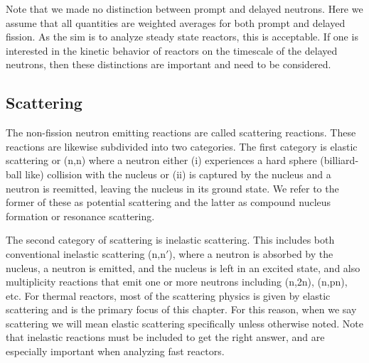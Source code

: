 Note that we made no distinction between prompt and delayed neutrons. Here we assume that all quantities are weighted averages for both prompt and delayed fission. As the sim is to analyze steady state reactors, this is acceptable. If one is interested in the kinetic behavior of reactors on the timescale of the delayed neutrons, then these distinctions are important and need to be considered. 

\subsection{Scattering}

The non-fission neutron emitting reactions are called scattering reactions. These reactions are likewise subdivided into two categories. The first category is elastic scattering or (n,n) where a neutron either (i) experiences a hard sphere (billiard-ball like) collision with the nucleus or (ii) is captured by the nucleus and a neutron is reemitted, leaving the nucleus in its ground state. We refer to the former of these as potential scattering and the latter as compound nucleus formation or resonance scattering. 

The second category of scattering is inelastic scattering. This includes both conventional inelastic scattering (n,$\text{n}'$), where a neutron is absorbed by the nucleus, a neutron is emitted, and the nucleus is left in an excited state, and also multiplicity reactions that emit one or more neutrons including (n,2n), (n,pn), etc. For thermal reactors, most of the scattering physics is given by elastic scattering and is the primary focus of this chapter. For this reason, when we say scattering we will mean elastic scattering specifically unless otherwise noted. Note that inelastic reactions must be included to get the right answer, and are especially important when analyzing fast reactors. 

